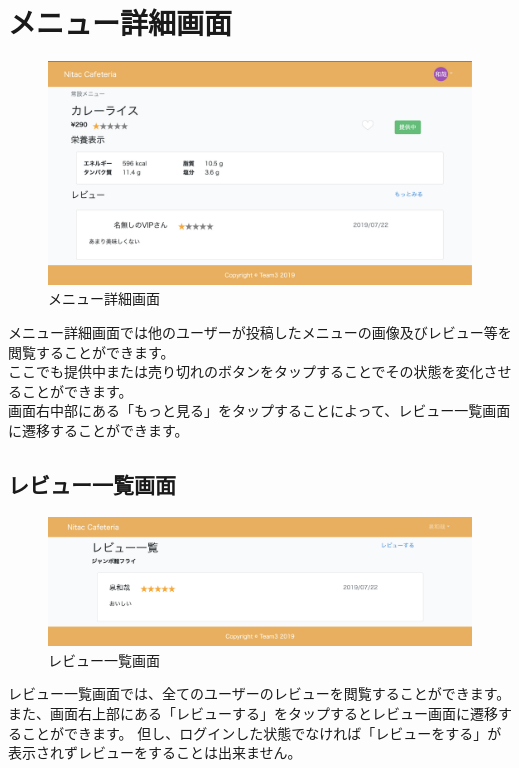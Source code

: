 \documentclass[a4paper]{jsarticle}
\begin{document}
\section{メニュー詳細画面}
\begin{figure}[htbp]
\centering
	\includegraphics[scale = 0.225]{image/detail.png}
	\caption{メニュー詳細画面}
\end{figure}
メニュー詳細画面では他のユーザーが投稿したメニューの画像及びレビュー等を閲覧することができます。\\
ここでも提供中または売り切れのボタンをタップすることでその状態を変化させることができます。\\
画面右中部にある「もっと見る」をタップすることによって、レビュー一覧画面に遷移することができます。\\
\subsection{レビュー一覧画面}
\begin{figure}[htbp]
\centering
	\includegraphics[scale = 0.225]{image/review.png}
	\caption{レビュー一覧画面}
\end{figure}
レビュー一覧画面では、全てのユーザーのレビューを閲覧することができます。\\
また、画面右上部にある「レビューする」をタップするとレビュー画面に遷移することができます。
但し、ログインした状態でなければ「レビューをする」が表示されずレビューをすることは出来ません。\\
\newpage
\end{document}
